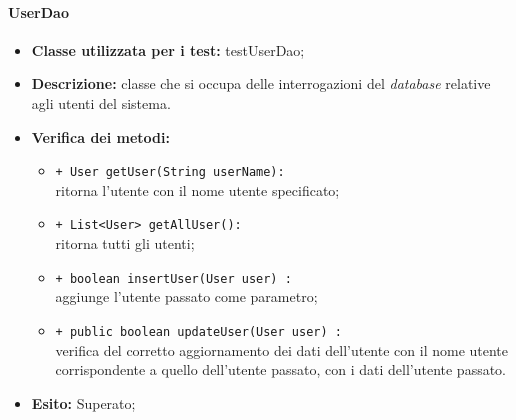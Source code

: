 \paragraph{UserDao}
\label{userdao}
\begin{flushleft}
\begin{itemize}
\item \textbf{Classe utilizzata per i test:} testUserDao;
\item \textbf{Descrizione:} classe che si occupa delle interrogazioni del \textit{database} relative agli utenti del sistema.
\item \textbf{Verifica dei metodi:}
\begin{sloppypar}
\begin{itemize}
\item \texttt{+ User getUser(String userName):}\\ ritorna l’utente con il nome utente specificato; 
\item \texttt{+ List<User> getAllUser():}\\ ritorna tutti gli utenti;
\item \texttt{+ boolean insertUser(User user) :}\\ aggiunge l'utente passato come parametro;
\item \texttt{+ public boolean updateUser(User user) :}\\ verifica del corretto aggiornamento dei dati dell'utente con il nome utente corrispondente a quello dell'utente passato, con i dati dell'utente passato.
\end{itemize}
\end{sloppypar}
\item \textbf{Esito:} Superato;
\end{itemize}
\end{flushleft}

